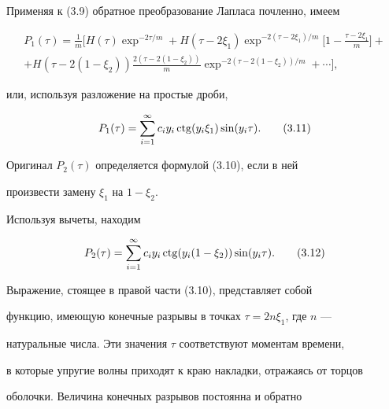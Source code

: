 Применяя к (3.9) обратное преобразование Лапласа почленно, имеем


\begin{multline}


P_{1}(\tau)=\frac{1}{m}\bigg[H(\tau)\exp^{-2\tau /m}+


H(\tau-2\xi_1)\exp^{-2(\tau-2\xi_1)/m}\bigg[1-\frac{\tau-2\xi_1}{m}


\bigg]+\\


+H(\tau-2(1-\xi_2))\frac{2(\tau-2(1-\xi_2))}{m}\exp^{-2(\tau-2(1-


\xi_2))/m}+\dotsb\bigg],


\tag{3.10}


\end{multline}


или, используя разложение на простые дроби,


\begin{equation}


P_{1}(\tau)=\sum_{i=1}^{\infty}c_{i}y_{i}\ctg(y_{i}\xi_1)


\sin(y_{i}\tau).


\tag{3.11}


\end{equation}





Оригинал $P_{2}(\tau)$ определяется формулой (3.10), если в ней


произвести замену $\xi_1$ на $1-\xi_2$.





Используя вычеты, находим


\begin{equation}


P_{2}(\tau)=\sum_{i=1}^{\infty}c_{i}y_{i}\ctg(y_{i}(1-\xi_2))


\sin(y_{i}\tau).


\tag{3.12}


\end{equation}


Выражение, стоящее в правой части (3.10), представляет собой


функцию, имеющую конечные разрывы в точках $\tau=2n\xi_1$, где $n$ ---


натуральные числа. Эти значения $\tau$ соответствуют моментам времени,


в которые упругие волны приходят к краю накладки, отражаясь от торцов


оболочки. Величина конечных разрывов постоянна и обратно


